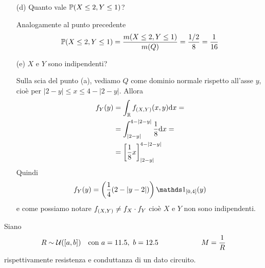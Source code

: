\begin{enumerate}
\item [(d)] Quanto vale $\mathbb{P}(X\leq 2,Y\leq 1)$?

Analogamente al punto precedente
\[
\mathbb{P}(X\leq 2,Y\leq 1)=\frac{m(X\leq 2,Y\leq 1)}{m(Q)}=\frac{1/2}{8}=\frac{1}{16}
\]

\item [(e)] $X$ e $Y$ sono indipendenti?

Sulla scia del punto (a), vediamo $Q$ come dominio normale rispetto all'asse $y$, cioè per $|2-y|\leq x\leq 4-|2-y|$. Allora
\begin{gather*}
\begin{aligned}
f_Y(y)&=\int_{\mathbb{R}}f_{(X,Y)}(x,y)\mathrm{d} x=\\
&=\int_{|2-y|}^{4-|2-y|}\frac{1}{8}\mathrm{d} x=\\
&=\left[\frac{1}{8} x  \right]_{|2-y|}^{4-|2-y|}
\end{aligned}
\end{gather*}
Quindi
\[
f_Y(y)=\left(\frac{1}{4}(2-|y-2|)  \right)\Ind_{[0,4]}(y)
\]
e come possiamo notare $f_{(X,Y)}\neq f_X\cdot f_Y$ cioè $X$ e $Y$ non sono indipendenti.

\end{enumerate}

\Soluzione{}
Siano
\[
R\sim\mathcal{U}([a,b])\quad \text{con }a=11.5,\ b=12.5\qquad\qquad\qquad M=\frac{1}{R}
\]
rispettivamente resistenza e conduttanza di un dato circuito.

